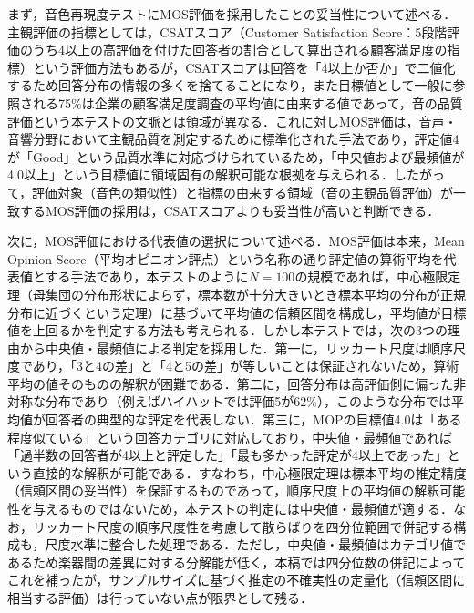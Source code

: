 まず，音色再現度テストにMOS評価を採用したことの妥当性について述べる．主観評価の指標としては，CSATスコア（Customer Satisfaction Score：5段階評価のうち4以上の高評価を付けた回答者の割合として算出される顧客満足度の指標）という評価方法もあるが，CSATスコアは回答を「4以上か否か」で二値化するため回答分布の情報の多くを捨てることになり，また目標値として一般に参照される75\%\cite{acsi}は企業の顧客満足度調査の平均値に由来する値であって，音の品質評価という本テストの文脈とは領域が異なる．これに対しMOS評価\cite{itu_p800}は，音声・音響分野において主観品質を測定するために標準化された手法であり，評定値4が「Good」という品質水準に対応づけられているため，「中央値および最頻値が4.0以上」という目標値に領域固有の解釈可能な根拠を与えられる．したがって，評価対象（音色の類似性）と指標の由来する領域（音の主観品質評価）が一致するMOS評価の採用は，CSATスコアよりも妥当性が高いと判断できる．

次に，MOS評価における代表値の選択について述べる．MOS評価は本来，Mean Opinion Score（平均オピニオン評点）という名称の通り評定値の算術平均を代表値とする手法であり，本テストのように$N=100$の規模であれば，中心極限定理（母集団の分布形状によらず，標本数が十分大きいとき標本平均の分布が正規分布に近づくという定理）に基づいて平均値の信頼区間を構成し，平均値が目標値を上回るかを判定する方法も考えられる．しかし本テストでは，次の3つの理由から中央値・最頻値による判定を採用した．第一に，リッカート尺度は順序尺度であり，「3と4の差」と「4と5の差」が等しいことは保証されないため，算術平均の値そのものの解釈が困難である．第二に，回答分布は高評価側に偏った非対称な分布であり（例えばハイハットでは評価5が62\%），このような分布では平均値が回答者の典型的な評定を代表しない．第三に，MOPの目標値4.0は「ある程度似ている」という回答カテゴリに対応しており，中央値・最頻値であれば「過半数の回答者が4以上と評定した」「最も多かった評定が4以上であった」という直接的な解釈が可能である．すなわち，中心極限定理は標本平均の推定精度（信頼区間の妥当性）を保証するものであって，順序尺度上の平均値の解釈可能性を与えるものではないため，本テストの判定には中央値・最頻値が適する．なお，リッカート尺度の順序尺度性を考慮して散らばりを四分位範囲で併記する構成も，尺度水準に整合した処理である．ただし，中央値・最頻値はカテゴリ値であるため楽器間の差異に対する分解能が低く，本稿では四分位数の併記によってこれを補ったが，サンプルサイズに基づく推定の不確実性の定量化（信頼区間に相当する評価）は行っていない点が限界として残る．

